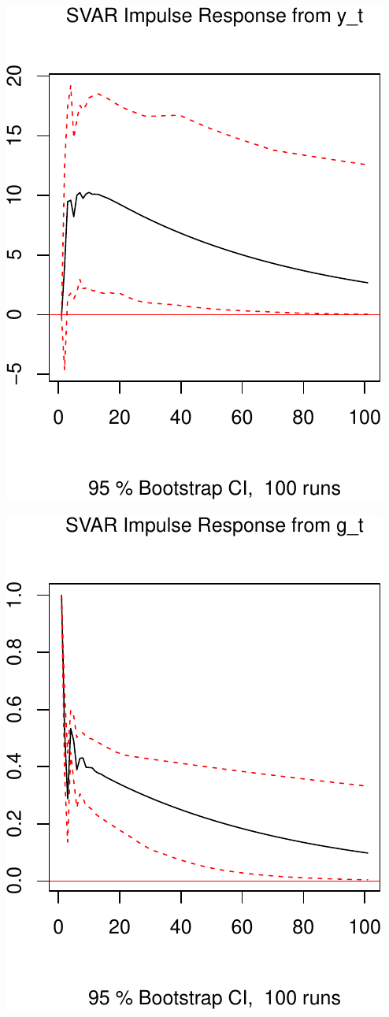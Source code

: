 \documentclass[11pt,preprint, authoryear]{elsarticle}
\numberwithin{equation}{section}
\numberwithin{figure}{section}
\numberwithin{table}{section}
\begin{document}
\includegraphics{TS_proj_files/figure-latex/unnamed-chunk-24-1.pdf}

\includegraphics{TS_proj_files/figure-latex/unnamed-chunk-25-1.pdf}
\end{document}
